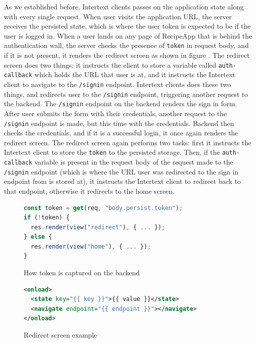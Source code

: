 As we established before, Intertext clients passes on the application state along with every single request. When user visits the application URL, the server receives the persisted state, which is where the user token is expected to be if the user is logged in. When a user lands on any page of RecipeApp that is behind the authentication wall, the server checks the presence of \texttt{token} in request body, and if it is not present, it renders the redirect screen as shown in figure . The redirect screen does two things: it instructs the client to store a variable called \texttt{auth-callback} which holds the URL that user is at, and it instructs the Intertext client to navigate to the \texttt{/signin} endpoint. Intertext clients does these two things, and redirects user to the \texttt{/signin} endpoint, triggering another request to the backend. The \texttt{/signin} endpoint on the backend renders the sign in form. After user submits the form with their credentials, another request to the \texttt{/signin} endpoint is made, but this time with the credentials. Backend then checks the credentials, and if it is a successful login, it once again renders the redirect screen. The redirect screen again performs two tasks: first it instructs the Intertext client to store the \texttt{token} to the persisted storage. Then, if the \texttt{auth-callback} variable is present in the request body of the request made to the \texttt{/signin} endpoint (which is where the URL user was redirected to the sign in endpoint from is stored at), it instructs the Intertext client to redirect back to that endpoint, otherwise it redirects to the home screen.

\begin{figure}[htb]
\begin{minipage}{\linewidth}
\begin{lstlisting}[language=javascript]
const token = get(req, "body.persist.token");
if (!token) {
  res.render(view("redirect"), { ... });
} else {
  res.render(view("home"), { ... });
}
\end{lstlisting}
\end{minipage}
\caption{How token is captured on the backend}%
\label{fig:token_capture}%
\end{figure}

\begin{figure}[htb]
\begin{minipage}{\linewidth}
\begin{lstlisting}[language=xml]
<onload>
  <state key="{{ key }}">{{ value }}</state>
  <navigate endpoint="{{ endpoint }}"></navigate>
</onload>
\end{lstlisting}
\end{minipage}
\caption{Redirect screen example}%
\label{fig:redirect_screen_example}%
\end{figure}


